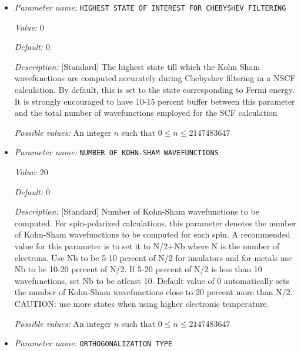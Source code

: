 \begin{itemize}
{\it Possible values:} A boolean value (true or false)
\item {\it Parameter name:} {\tt HIGHEST STATE OF INTEREST FOR CHEBYSHEV FILTERING}
\label{parameters:SCF parameters/Eigen_2dsolver parameters/HIGHEST STATE OF INTEREST FOR CHEBYSHEV FILTERING}
\label{parameters:SCF_20parameters/Eigen_2dsolver_20parameters/HIGHEST_20STATE_20OF_20INTEREST_20FOR_20CHEBYSHEV_20FILTERING}


{\it Value:} 0


{\it Default:} 0


{\it Description:} [Standard] The highest state till which the Kohn Sham wavefunctions are computed accurately during Chebyshev filtering in a NSCF calculation. By default, this is set to the state corresponding to Fermi energy. It is strongly encouraged to have 10-15 percent buffer between this parameter and the total number of wavefunctions employed for the SCF calculation 


{\it Possible values:} An integer $n$ such that $0\leq n \leq 2147483647$
\item {\it Parameter name:} {\tt NUMBER OF KOHN-SHAM WAVEFUNCTIONS}
\label{parameters:SCF parameters/Eigen_2dsolver parameters/NUMBER OF KOHN_2dSHAM WAVEFUNCTIONS}
\label{parameters:SCF_20parameters/Eigen_2dsolver_20parameters/NUMBER_20OF_20KOHN_2dSHAM_20WAVEFUNCTIONS}


{\it Value:} 20


{\it Default:} 0


{\it Description:} [Standard] Number of Kohn-Sham wavefunctions to be computed. For spin-polarized calculations, this parameter denotes the number of Kohn-Sham wavefunctions to be computed for each spin. A recommended value for this parameter is to set it to N/2+Nb where N is the number of electrons. Use Nb to be 5-10 percent of N/2 for insulators and for metals use Nb to be 10-20 percent of N/2. If 5-20 percent of N/2 is less than 10 wavefunctions, set Nb to be atleast 10. Default value of 0 automatically sets the number of Kohn-Sham wavefunctions close to 20 percent more than N/2. CAUTION: use more states when using higher electronic temperature.


{\it Possible values:} An integer $n$ such that $0\leq n \leq 2147483647$
\item {\it Parameter name:} {\tt ORTHOGONALIZATION TYPE}
\label{parameters:SCF parameters/Eigen_2dsolver parameters/ORTHOGONALIZATION TYPE}
\label{parameters:SCF_20parameters/Eigen_2dsolver_20parameters/ORTHOGONALIZATION_20TYPE}



\end{itemize}

